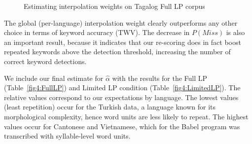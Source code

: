 \begin{figure}[t]
\caption[Estimating interpolation weights]{Estimating interpolation weights on Tagalog Full LP corpus\label{fig:tagalogInterp}}
\end{figure}

The global (per-language) interpolation weight clearly outperforms any other choice in terms of keyword accuracy (TWV).   The decrease in $P(Miss)$ is also an important result, because it indicates that our re-scoring does in fact boost repeated keywords above the detection threshold, increasing the number of correct keyword detections.  

We include our final estimate for $\widehat{\alpha}$ with the results for the Full LP (Table~\ref{fig4:FullLP}) and Limited LP condition (Table~\ref{fig4:LimitedLP}).  The relative values correspond to our expectations by language.  The lowest values (least repetition) occur for the Turkish data, a language known for its morphological complexity, hence word units are less likely to repeat.  The highest values occur for Cantonese and Vietnamese, which for the Babel program was transcribed with syllable-level word units.

